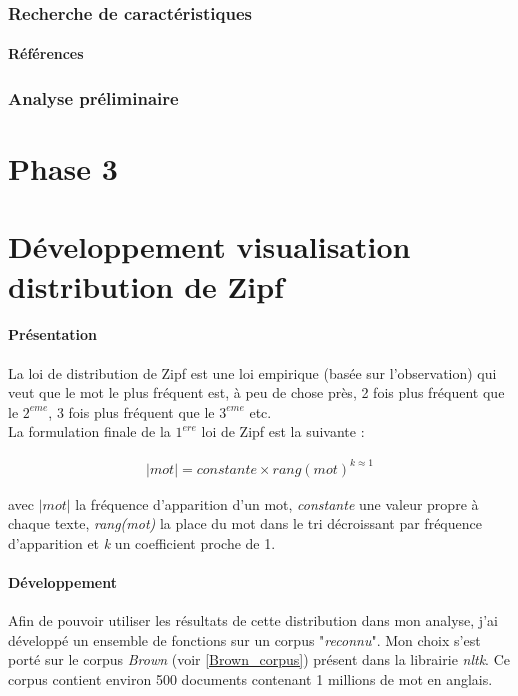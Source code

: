 \documentclass[a4paper,12pt]{article}
\begin{document}
		\subsubsection{Recherche de caractéristiques}
			\paragraph{Références}
							
				
		\subsubsection{Analyse préliminaire}

\newpage
\section{Phase 3}

\newpage	
\appendix
\section{Développement visualisation distribution de Zipf}
	\paragraph{Présentation}
		La loi de distribution de Zipf est une loi empirique (basée sur l'observation) qui veut que le mot le plus fréquent est, à peu de chose près, 2 fois plus fréquent que le $2^{eme}$, 3 fois plus fréquent que le $3^{eme}$ etc.\\
		
		La formulation finale de la $1^{ere}$ loi de Zipf est la suivante :
		
		\begin{align*}
				|mot| = constante \times rang(mot)^{k \approx 1}
		\end{align*}
		
		avec \emph{$|mot|$} la fréquence d'apparition d'un mot, \emph{constante} une valeur propre à chaque texte, \emph{rang(mot)} la place du mot dans le tri décroissant par fréquence d'apparition et \emph{k} un coefficient proche de 1. 
		
	\paragraph{Développement}
		Afin de pouvoir utiliser les résultats de cette distribution dans mon analyse, j'ai développé un ensemble de fonctions sur un corpus "\emph{reconnu}". Mon choix s'est porté sur le corpus \emph{Brown} (voir \ref{Brown_corpus}) présent dans la librairie \emph{nltk}. Ce corpus contient environ 500 documents contenant 1 millions de mot en anglais.\\
		
\end{document}
